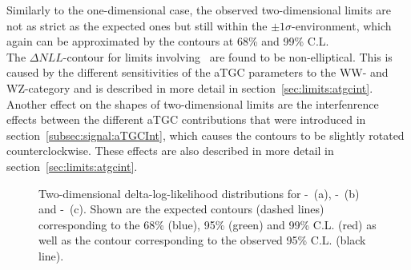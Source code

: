 \noindent Similarly to the one-dimensional case, the observed two-dimensional limits are not as strict as the expected ones but still within the $\pm 1\sigma$-environment, which again can be approximated by the contours at 68\% and 99\% C.L.\\

\noindent The $\Delta NLL$-contour for limits involving \Tcb \ are found to be non-elliptical. This is caused by the different sensitivities of the aTGC parameters to the WW- and WZ-category and is described in more detail in section~\ref{sec:limits:atgcint}. Another effect on the shapes of two-dimensional limits are the interfenrence effects between the different aTGC contributions that were introduced in section~\ref{subsec:signal:aTGCInt}, which causes the contours to be slightly rotated counterclockwise. These effects are also described in more detail in section~\ref{sec:limits:atgcint}.

\begin{figure}
	\centering
	\caption[Two-dimensional delta-log-likelihood distributions for the three combinations of aTGC parameters]{Two-dimensional delta-log-likelihood distributions for \Tcwww -\Tccw \ (a), \Tcwww -\Tcb \ (b) and \Tccw -\Tcb\ (c). Shown are the expected contours (dashed lines) corresponding to the 68\% (blue), 95\% (green) and 99\% C.L. (red) as well as the contour corresponding to the observed 95\% C.L. (black line).}
	\label{fig:limits:2dlimits}	
\end{figure}

